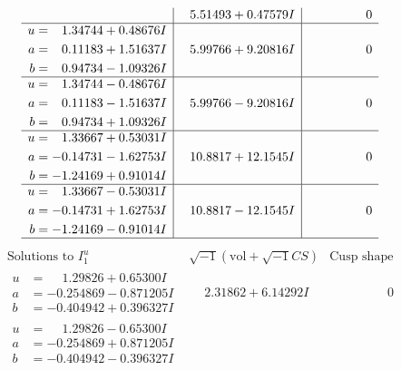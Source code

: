 \documentclass[1p]{elsarticle_modified}
\theoremstyle{definition}
\newcommand{\I}{\sqrt{-1}}
\begin{document}
$$\begin{array}{c|c|c}
 & \phantom{-}5.51493 + 0.47579 I & \phantom{-0.000000 } 0 \\ \hline\begin{aligned}
u &= \phantom{-}1.34744 + 0.48676 I \\
a &= \phantom{-}0.11183 + 1.51637 I \\
b &= \phantom{-}0.94734 - 1.09326 I\end{aligned}
 & \phantom{-}5.99766 + 9.20816 I & \phantom{-0.000000 } 0 \\ \hline\begin{aligned}
u &= \phantom{-}1.34744 - 0.48676 I \\
a &= \phantom{-}0.11183 - 1.51637 I \\
b &= \phantom{-}0.94734 + 1.09326 I\end{aligned}
 & \phantom{-}5.99766 - 9.20816 I & \phantom{-0.000000 } 0 \\ \hline\begin{aligned}
u &= \phantom{-}1.33667 + 0.53031 I \\
a &= -0.14731 - 1.62753 I \\
b &= -1.24169 + 0.91014 I\end{aligned}
 & \phantom{-}10.8817 + 12.1545 I & \phantom{-0.000000 } 0 \\ \hline\begin{aligned}
u &= \phantom{-}1.33667 - 0.53031 I \\
a &= -0.14731 + 1.62753 I \\
b &= -1.24169 - 0.91014 I\end{aligned}
 & \phantom{-}10.8817 - 12.1545 I & \phantom{-0.000000 } 0\\
 \hline 
 \end{array}$$\newpage$$\begin{array}{c|c|c}  
\text{Solutions to }I^u_{1}& \I (\text{vol} + \sqrt{-1}CS) & \text{Cusp shape}\\
 \hline 
\begin{aligned}
u &= \phantom{-}1.29826 + 0.65300 I \\
a &= -0.254869 - 0.871205 I \\
b &= -0.404942 + 0.396327 I\end{aligned}
 & \phantom{-}2.31862 + 6.14292 I & \phantom{-0.000000 } 0 \\ \hline\begin{aligned}
u &= \phantom{-}1.29826 - 0.65300 I \\
a &= -0.254869 + 0.871205 I \\
b &= -0.404942 - 0.396327 I\end{aligned}

\end{array}$$
\end{document}
